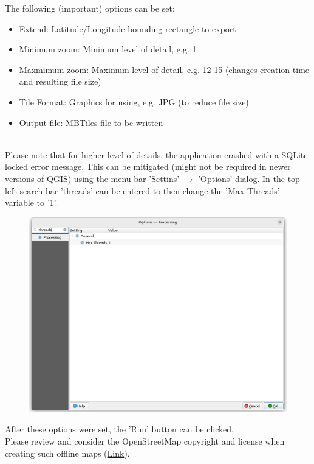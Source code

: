 The following (important) options can be set:
\begin{itemize}
 \item Extend: Latitude/Longitude bounding rectangle to export
 \item Minimum zoom: Minimum level of detail, e.g. 1
 \item Maxmimum zoom: Maximum level of detail, e.g. 12-15 (changes creation time and resulting file size)
 \item Tile Format: Graphics for using, e.g. JPG (to reduce file size)
 \item Output file: MBTiles file to be written
\end{itemize}
 \ \\

Please note that for higher level of details, the application crashed with a SQLite locked error message. This can be mitigated (might not be required in newer versions of QGIS) using the menu bar 'Settins' $\rightarrow$ 'Options' dialog. In the top left search bar 'threads' can be entered to then change the 'Max Threads' variable to '1'. \\

\begin{figure}[H]
    \includegraphics[width=14cm,frame]{figures/qgis_osm4.png}
\end{figure}
 
After these options were set, the 'Run' button can be clicked. \\

Please review and consider the OpenStreetMap copyright and license when creating such offline maps (\href{https://www.openstreetmap.org/copyright}{Link}). \\

